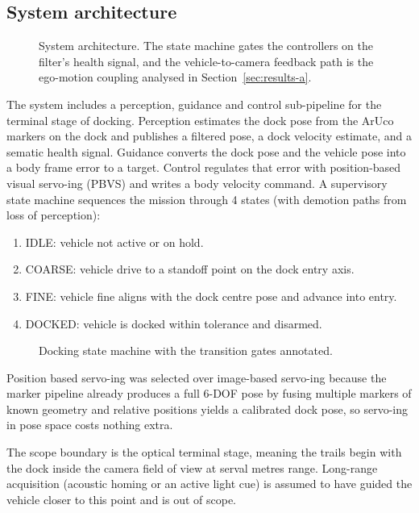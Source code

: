 \subsection{System architecture}

\begin{figure}[H]
  \centering
  
  \caption{System architecture. The state machine gates the controllers on the
    filter's health signal, and the vehicle-to-camera feedback path is the
    ego-motion coupling analysed in Section~\ref{sec:results-a}.}
  \label{fig:arch}
\end{figure}

The system includes a perception, guidance and control sub-pipeline for the terminal stage of docking. Perception estimates the dock pose from the ArUco markers on the dock and publishes a filtered pose, a dock velocity estimate, and a sematic health signal. Guidance converts the dock pose and the vehicle pose into a body frame error to a target. Control regulates that error with position-based visual servo-ing (PBVS) and writes a body velocity command. A supervisory state machine sequences the mission through 4 states (with demotion paths from loss of perception):

\begin{enumerate}
  \item \textsc{IDLE}: vehicle not active or on hold.
  \item \textsc{COARSE}: vehicle drive to a standoff point on the dock entry axis.
  \item \textsc{FINE}: vehicle fine aligns with the dock centre pose and advance into entry.
  \item \textsc{DOCKED}: vehicle is docked within tolerance and disarmed.
\end{enumerate}

\begin{figure}[H]
  \centering
  
  \caption{Docking state machine with the transition gates annotated.}
  \label{fig:fsm}
\end{figure}

Position based servo-ing was selected over image-based servo-ing because the marker pipeline already produces a full 6-DOF pose by fusing multiple markers of known geometry and relative positions yields a calibrated dock pose, so servo-ing in pose space costs nothing extra.

The scope boundary is the optical terminal stage, meaning the trails begin with the dock inside the camera field of view at serval metres range. Long-range acquisition (acoustic homing or an active light cue) is assumed to have guided the vehicle closer to this point and is out of scope.
